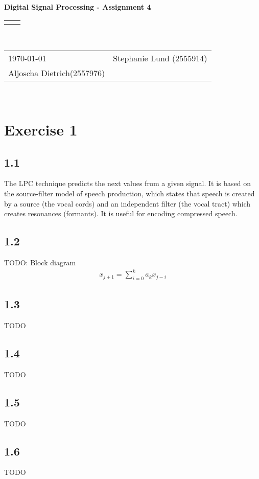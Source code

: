 \documentclass[12pt]{article}
\renewcommand{\title}[1]{\textbf{#1}\\}
\renewcommand{\line}{\begin{tabularx}{\textwidth}{X>{\raggedleft}X}\hline\\\end{tabularx}\\[-0.5cm]}
\newcommand{\leftright}[2]{\begin{tabularx}{\textwidth}{X>{\raggedleft}X}#1%
& #2\\\end{tabularx}\\[-0.5cm]}
\begin{document}
\title{Digital Signal Processing - Assignment 4}
\line
\leftright{\today}{Stephanie Lund (2555914)\\Aljoscha Dietrich(2557976)} %

\section*{Exercise 1}

\subsection*{1.1}
The LPC technique predicts the next values from a given signal. It is based on the source-filter model of speech production, which states that speech is created by a source (the vocal cords) and an independent filter (the vocal tract) which creates resonances (formants). It is useful for encoding compressed speech.

\subsection*{1.2}
TODO: Block diagram
\begin{align*}
	x_{j+1} = \sum_{i=0}^{k} a_k x_{j-i}
\end{align*}

\subsection*{1.3}
TODO

\subsection*{1.4}
TODO

\subsection*{1.5}
TODO

\subsection*{1.6}
TODO
\end{document}
